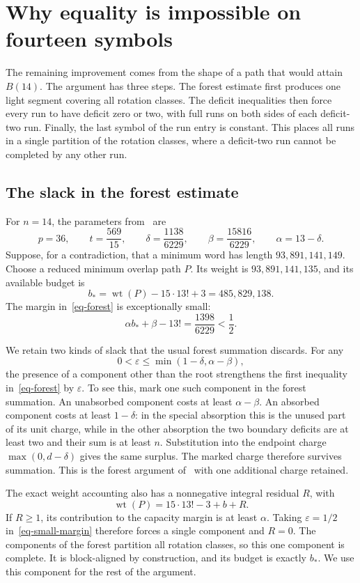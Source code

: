 \documentclass[11pt]{article}
\DeclareMathOperator{\wt}{wt}
\begin{document}
\section{Why equality is impossible on fourteen symbols}
The remaining improvement comes from the shape of a path that would
attain $B(14)$. The argument has three steps. The forest estimate first
produces one light segment covering all rotation classes. The deficit inequalities
then force every run to have deficit zero or two, with full runs on
both sides of each deficit-two run. Finally, the last symbol of the run
entry is constant. This places all runs in a single partition of the
rotation classes, where a deficit-two run cannot be completed by any
other run.

\subsection{The slack in the forest estimate}
For $n=14$, the parameters from~\cite{returns} are
\[
 p=36,\qquad t=\frac{569}{15},\qquad
 \delta=\frac{1138}{6229},\qquad
 \beta=\frac{15816}{6229},\qquad \alpha=13-\delta.
\]
Suppose, for a contradiction, that a minimum word has length
$93{,}891{,}141{,}149$. Choose a reduced minimum overlap path $P$.
Its weight is $93{,}891{,}141{,}135$, and its available budget is
\[
 b_* = \wt(P)-15\cdot13!+3=485{,}829{,}138.
\]
The margin in~\eqref{eq-forest} is exceptionally small:
\begin{equation}\label{eq-small-margin}
 \alpha b_*+\beta-13!=\frac{1398}{6229}<\frac12.
\end{equation}

We retain two kinds of slack that the usual forest summation discards.
For any
\[
 0<\varepsilon\le\min(1-\delta,\alpha-\beta),
\]
the presence of a component other than the root strengthens the first
inequality in~\eqref{eq-forest} by $\varepsilon$. To see this, mark one
such component in the forest summation. An unabsorbed component costs
at least $\alpha-\beta$. An absorbed component costs at least
$1-\delta$: in the special absorption this is the unused part of its
unit charge, while in the other absorption the two boundary deficits
are at least two and their sum is at least $n$. Substitution into the
endpoint charge $\max(0,d-\delta)$ gives the same surplus. The marked
charge therefore survives summation. This is the forest argument
of~\cite{returns} with one additional charge retained.

The exact weight accounting also has a nonnegative integral residual
$R$, with
\[
 \wt(P)=15\cdot13!-3+b+R.
\]
If $R\ge1$, its contribution to the capacity margin is at least
$\alpha$. Taking $\varepsilon=1/2$ in~\eqref{eq-small-margin} therefore
forces a single component and $R=0$. The components of the forest
partition all rotation classes, so this one component is complete. It is
block-aligned by construction, and its budget is exactly $b_*$. We use
this component for the rest of the argument.
\end{document}
